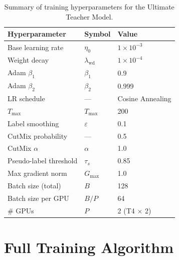 \documentclass[12pt, a4paper]{article}
\begin{document}
\begin{table}[h]
\centering
\caption{Summary of training hyperparameters for the Ultimate Teacher Model.}
\begin{tabular}{@{}lll@{}}
\toprule
\textbf{Hyperparameter} & \textbf{Symbol} & \textbf{Value} \\
\midrule
Base learning rate & $\eta_0$ & $1 \times 10^{-3}$ \\
Weight decay & $\lambda_{\text{wd}}$ & $1 \times 10^{-4}$ \\
Adam $\beta_1$ & $\beta_1$ & 0.9 \\
Adam $\beta_2$ & $\beta_2$ & 0.999 \\
LR schedule & — & Cosine Annealing \\
$T_{\max}$ & $T_{\max}$ & 200 \\
Label smoothing & $\varepsilon$ & 0.1 \\
CutMix probability & — & 0.5 \\
CutMix $\alpha$ & $\alpha$ & 1.0 \\
Pseudo-label threshold & $\tau_s$ & 0.85 \\
Max gradient norm & $G_{\max}$ & 1.0 \\
Batch size (total) & $B$ & 128 \\
Batch size per GPU & $B/P$ & 64 \\
\# GPUs & $P$ & 2 (T4 $\times$ 2) \\
\bottomrule
\end{tabular}
\end{table}

\section{Full Training Algorithm}
\end{document}
